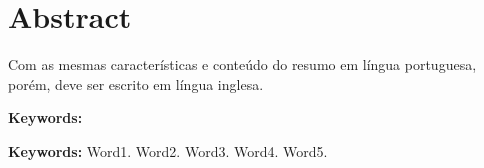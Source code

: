 \chapter*{Abstract}
\vspace{4cm}
\noindent
Com as mesmas características e conteúdo do resumo em língua portuguesa, porém, deve ser escrito em língua inglesa.

\begin{labeling}{\textbf{Keywords:}}
\item[\textbf{Keywords:}] 
Word1. 
Word2. 
Word3. 
Word4. 
Word5.
\end{labeling}

